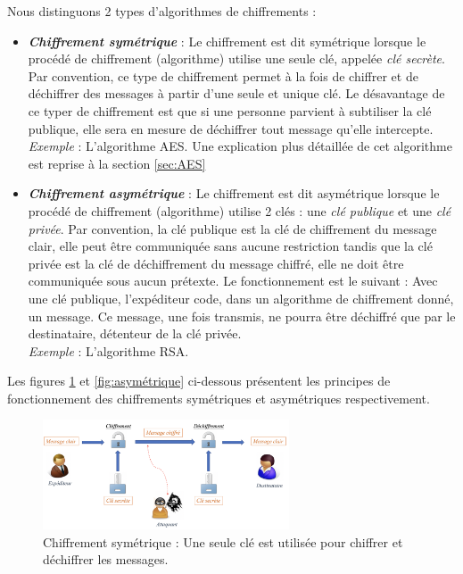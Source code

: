 \documentclass[10pt, oneside, a4paper]{article}
\begin{document}
\newpage

Nous distinguons 2 types d'algorithmes de chiffrements : 
\begin{itemize}
\item \textbf{\textit{Chiffrement symétrique}} : Le chiffrement est dit symétrique lorsque le procédé de chiffrement (algorithme) utilise une seule clé, appelée \textit{clé secrète}. Par convention, ce type de chiffrement permet à la fois de chiffrer et de déchiffrer des messages à partir d'une seule et unique clé. Le désavantage de ce typer de chiffrement est que si une personne parvient à subtiliser la clé publique, elle sera en mesure de déchiffrer tout message qu'elle intercepte.  \\
\textit{Exemple} : L'algorithme AES. Une explication plus détaillée de cet algorithme est reprise à la section \ref{sec:AES}
\item \textbf{\textit{Chiffrement asymétrique}} : Le chiffrement est dit asymétrique lorsque le procédé de chiffrement (algorithme) utilise 2 clés : une \textit{clé publique} et une \textit{clé privée}. Par convention, la clé publique est la clé de chiffrement du message clair, elle peut être communiquée sans aucune restriction tandis que la clé privée est la clé de déchiffrement du message chiffré, elle ne doit être communiquée sous aucun prétexte. Le fonctionnement est le suivant : Avec une clé publique, l'expéditeur code, dans un algorithme de chiffrement donné, un message. Ce message, une fois transmis, ne pourra être déchiffré que par le destinataire, détenteur de la clé privée. \\
\textit{Exemple} : L'algorithme RSA. \\
\end{itemize}

Les figures \ref{fig:symétrique} et \ref{fig:asymétrique} ci-dessous présentent les principes de fonctionnement des chiffrements symétriques et asymétriques respectivement.

\begin{figure}[htbp]
    \centering
    \includegraphics[width=0.65\textwidth]{image/symetrique}
    \caption{Chiffrement symétrique : Une seule clé est utilisée pour chiffrer et déchiffrer les messages.}
    \label{fig:symétrique}
\end{figure}
\end{document}
